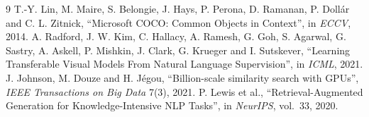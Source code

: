 \documentclass[11pt,a4paper]{article}
\renewcommand{\_}{\textunderscore\allowbreak{}}
\begin{document}
\begin{thebibliography}{9}
 T.-Y. Lin, M. Maire, S. Belongie, J. Hays, P. Perona, D. Ramanan, P. Doll\'ar and C. L. Zitnick, ``Microsoft COCO: Common Objects in Context'', in \emph{ECCV}, 2014.
 A. Radford, J. W. Kim, C. Hallacy, A. Ramesh, G. Goh, S. Agarwal, G. Sastry, A. Askell, P. Mishkin, J. Clark, G. Krueger and I. Sutskever, ``Learning Transferable Visual Models From Natural Language Supervision'', in \emph{ICML}, 2021.
 J. Johnson, M. Douze and H. J\'egou, ``Billion-scale similarity search with GPUs'', \emph{IEEE Transactions on Big Data} 7(3), 2021.
 P. Lewis et al., ``Retrieval-Augmented Generation for Knowledge-Intensive NLP Tasks'', in \emph{NeurIPS}, vol.~33, 2020.
\end{thebibliography}
\end{document}
